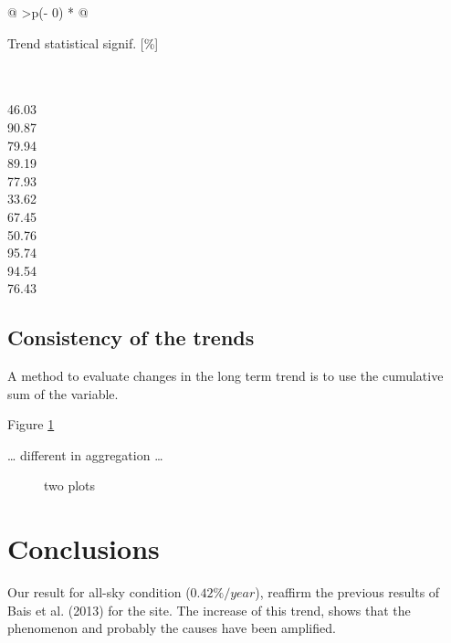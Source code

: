 \documentclass[
  preprint, 3p, authoryear]{article}
\begin{document}
\begin{longtable}[]{@{}
  >{\centering\arraybackslash}p{(\columnwidth - 0\tabcolsep) * }@{}}
\toprule
\begin{minipage}[b]{\linewidth}\centering
Trend statistical signif. {[}\%{]}
\end{minipage} \\
\midrule
{} \\
46.03 \\
90.87 \\
79.94 \\
89.19 \\
77.93 \\
33.62 \\
67.45 \\
50.76 \\
95.74 \\
94.54 \\
76.43 \\
\bottomrule
\end{longtable}

\hypertarget{consistency-of-the-trends}{%
\subsection{Consistency of the trends}\label{consistency-of-the-trends}}

A method to evaluate changes in the long term trend is to use the cumulative sum of the variable.

Figure \ref{fig:cumsum}

\ldots{} different in aggregation \ldots{}

\begin{figure}[h!]

{\centering {}

}

\caption{two plots}\label{fig:cumsum}
\end{figure}

\hypertarget{conclusions}{%
\section{Conclusions}\label{conclusions}}

Our result for all-sky condition (\(0.42\%/year\)), reaffirm the previous results of Bais et al. (2013) for the site.
The increase of this trend, shows that the phenomenon and probably the causes have been amplified.
\end{document}
